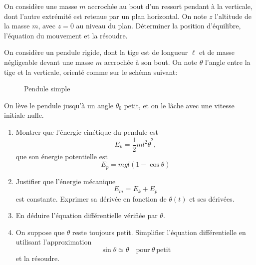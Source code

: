 \documentclass{article}
\theoremstyle{definition}
\begin{document}
\begin{exo}
	On considère une masse $m$ accrochée au bout d'un ressort pendant à la verticale, dont l'autre extrémité est retenue par un plan horizontal. On note $z$ l'altitude de la masse $m$, avec $z=0$ au niveau du plan. Déterminer la position d'équilibre, l'équation du mouvement et la résoudre.
\end{exo}

\begin{exo}
	On considère un pendule rigide, dont la tige est de longueur $\ell$ et de masse négligeable devant une masse $m$ accrochée à son bout. On note $\theta$ l'angle entre la tige et la verticale, orienté comme sur le schéma suivant:
	\begin{figure}[H]
	\centering
 	\caption{Pendule simple}
	\end{figure}
	
	On lève le pendule jusqu'à un angle $\theta_0$ petit, et on le lâche avec une vitesse initiale nulle.
	
	\begin{enumerate}
	\item Montrer que l'énergie cinétique du pendule est
	\[
	E_k = \frac 1 2 ml^2\dot{\theta}^2,
	\]
	que son énergie potentielle est
	\[
	E_p = mgl(1-\cos\theta)
	\]
	\item Justifier que l'énergie mécanique
	\[
	E_m = E_k + E_p
	\]
	est constante. Exprimer sa dérivée en fonction de $\theta(t)$ et ses dérivées.
	\item En déduire l'équation différentielle vérifiée par $\theta$.
	\item On suppose que $\theta$ reste toujours petit. Simplifier l'équation différentielle en utilisant l'approximation
	\[
	\sin\theta \simeq \theta\quad \text{pour}\ \theta\ \text{petit}
	\]
	et la résoudre.
	\end{enumerate}
\end{exo}
\end{document}
